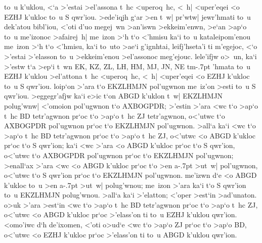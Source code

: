 \begin{Parallel}{}{}
{{to~u k'uklou, <`a >'estai >el'assona t~hc <uperoq~hc, <~h| <uper'eqei <o EZHJ
k'ukloc to~u S qwr'iou. >ede'iqjh g`ar >en t~w| pr'wtw| jewr'hmati to~u dek'atou
bibl'iou, <'oti d'uo megej~wn >an'iswn >ekkeim'enwn, >e`an >ap`o to~u me'izonoc
>afairej~h| me~izon >`h t`o <'hmisu ka`i to~u kataleipom'enou me~izon >`h
t`o <'hmisu, ka`i to~uto >ae`i g'ignhtai, leifj'hseta'i ti m'egejoc, <`o >'estai >'elasson
to~u >ekkeim'enou >el'assonoc meg'ejouc. lele'ifjw o>~un, ka`i >'estw t`a >ep`i
t~wn EK, KZ, ZL, LH, HM, MJ, JN, NE tm\kern -.7pt 'hmata to~u EZHJ k'uklou >el'attona
t~hc <uperoq~hc, <~h| <uper'eqei <o EZHJ k'ukloc to~u S qwr'iou. loip`on >'ara t`o EKZLHMJN pol'ugwnon
me~iz'on >esti to~u S qwr'iou.
 >eggegr'afjw ka`i e>ic t`on ABGD k'uklon t~w| EKZLHMJN
polug'wnw| <'omoion pol'ugwnon t`o AXBOGPDR; >'estin >'ara <wc t`o >ap`o
t~hc BD tetr'agwnon pr`oc t`o >ap`o t~hc ZJ tetr'agwnon, o<'utwc t`o
AXBOGPDR pol'ugwnon pr`oc t`o EKZLHMJN pol'ugwnon. >all`a ka`i <wc  t`o >ap`o t~hc BD tetr'agwnon pr`oc t`o >ap`o t~hc
ZJ, o<'utwc <o ABGD k'ukloc pr`oc t`o S qwr'ion; ka`i <wc >'ara <o ABGD k'ukloc
pr`oc t`o S qwr'ion, o<'utwc t`o AXBOGPDR pol'ugwnon pr`oc t`o EKZLHMJN
pol'ugwnon; >enall`ax >'ara <wc <o ABGD k'ukloc pr`oc t`o >en a\kern -.7pt >ut~w| pol'ugwnon, o<'utwc t`o S qwr'ion pr`oc t`o EKZLHMJN pol'ugwnon.  me'izwn d`e <o ABGD k'ukloc to~u >en a\kern -.7pt >ut~w| polug'wnou; me~izon >'ara ka`i t`o S qwr'ion to~u EKZLHMJN polug'wnou. >all`a
ka`i >'elatton; <'oper >est`in >ad'unaton. o>uk >'ara >est`in <wc t`o >ap`o t~hc BD tetr'agwnon pr`oc t`o >ap`o t~hc ZJ, o<'utwc <o ABGD k'ukloc pr`oc >'elass'on ti to~u EZHJ k'uklou qwr'ion. <omo'iwc d`h de'ixomen, <'oti o>ud`e <wc t`o >ap`o ZJ pr`oc
t`o >ap`o BD, o<'utwc <o EZHJ k'ukloc pr`oc >'elass'on ti to~u ABGD k'uklou qwr'ion.}



}
\end{Parallel}
